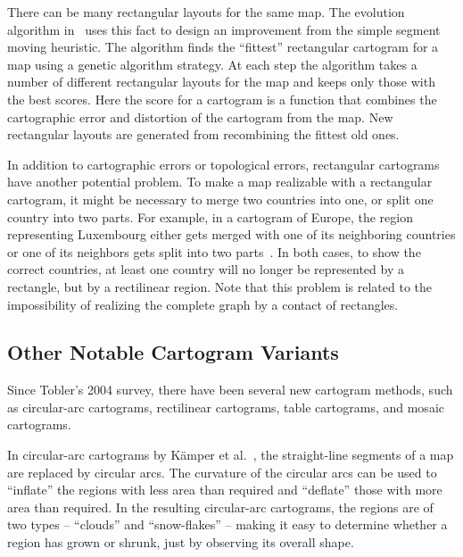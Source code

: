 \documentclass{egpubl}
\begin{document}
There can be many rectangular layouts for the same map. The evolution algorithm in~\cite{BSV12} uses this fact to design an improvement from the simple segment moving heuristic. The algorithm finds the ``fittest'' rectangular cartogram for a map using a genetic algorithm strategy. At each step the algorithm takes a number of different rectangular layouts for the map and keeps only those with the best scores. Here the score for a cartogram is a function that combines the cartographic error and distortion of the cartogram from the map. New rectangular layouts are generated from recombining the fittest old ones.


In addition to cartographic errors or topological errors, rectangular cartograms have another potential problem. To make a map realizable with a rectangular cartogram, it might be necessary to merge two countries into one, or split one country into two parts. For example, in a cartogram of Europe, the region representing Luxembourg either gets merged with one of its neighboring countries or one of its neighbors gets split into two parts~\cite{ks07}. In both cases, to show the correct countries, at least one country will no longer be represented by a rectangle, but by a rectilinear region. Note that this problem is related to the impossibility of realizing the complete graph by a contact of rectangles.

\subsection{Other Notable Cartogram Variants}



Since Tobler's 2004 survey, there have been several new cartogram methods, such as circular-arc cartograms, rectilinear cartograms, table cartograms, and mosaic cartograms. 

In circular-arc cartograms by K\"amper et al.~\cite{KKN13}, the straight-line segments of a map are replaced by circular arcs. The curvature of the circular arcs can be used to ``inflate'' the regions with less area than required and ``deflate'' those with more area than required. In the resulting circular-arc cartograms, the regions are of two types --  ``clouds'' and ``snow-flakes'' -- making it easy to determine whether a region has grown or shrunk, just by observing its overall shape. 
\end{document}
